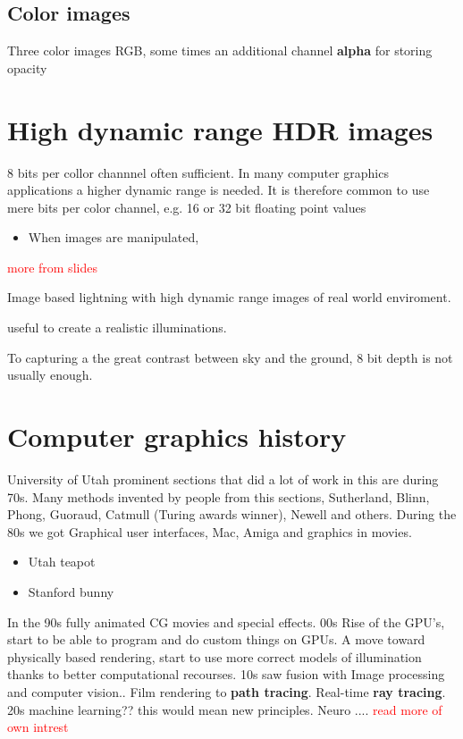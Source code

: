 \subsection{Color images}
Three color images RGB, some times an additional channel \textbf{alpha} for storing opacity

\section{High dynamic range \textbf{HDR} images}
8 bits per collor channnel often sufficient. In many computer graphics applications a higher dynamic range is needed. It is therefore common to use mere bits per color channel, e.g. 16 or 32 bit floating point values

\begin{itemize}
	\item When images are manipulated, 
\end{itemize}

\textcolor{red}{more from slides}

Image based lightning with high dynamic range images of real world enviroment. 

useful to create a realistic illuminations. 

To capturing a the great contrast between sky and the ground, 8 bit depth is not usually enough.  

\section{Computer graphics history}
University of Utah prominent sections that did a lot of work in this are during 70s. Many methods invented by people from this sections, Sutherland, Blinn, Phong, Guoraud, Catmull (Turing awards winner), Newell and others. During the 80s we got Graphical user interfaces, Mac, Amiga and graphics in movies. 

\begin{itemize}
	\item Utah teapot
	\item Stanford bunny
\end{itemize}

In the 90s fully animated CG movies and special effects. 00s Rise of the GPU's, start to be able to program and do custom things on GPUs. A move toward physically based rendering, start to use more correct models of illumination thanks to better computational recourses. 10s saw fusion with Image processing and computer vision.. Film rendering to \textbf{path tracing}. Real-time \textbf{ray tracing}. 20s machine learning?? this would mean new principles. Neuro .... \textcolor{red}{read more of own intrest} 


